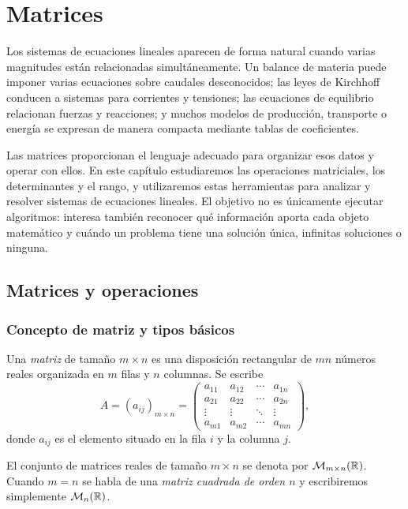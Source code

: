 \chapter{Matrices}
\label{ch:matrices}

Los sistemas de ecuaciones lineales aparecen de forma natural cuando varias magnitudes están relacionadas simultáneamente. Un balance de materia puede imponer varias ecuaciones sobre caudales desconocidos; las leyes de Kirchhoff conducen a sistemas para corrientes y tensiones; las ecuaciones de equilibrio relacionan fuerzas y reacciones; y muchos modelos de producción, transporte o energía se expresan de manera compacta mediante tablas de coeficientes.

Las matrices proporcionan el lenguaje adecuado para organizar esos datos y operar con ellos. En este capítulo estudiaremos las operaciones matriciales, los determinantes y el rango, y utilizaremos estas herramientas para analizar y resolver sistemas de ecuaciones lineales. El objetivo no es únicamente ejecutar algoritmos: interesa también reconocer qué información aporta cada objeto matemático y cuándo un problema tiene una solución única, infinitas soluciones o ninguna.

\section{Matrices y operaciones}
\label{sec:matrices-operaciones}

\subsection{Concepto de matriz y tipos básicos}

\begin{definition}[Matriz]
Una \emph{matriz} de tamaño $m\times n$ es una disposición rectangular de $mn$ números reales organizada en $m$ filas y $n$ columnas. Se escribe
\[
A=(a_{ij})_{m\times n}
=
\begin{pmatrix}
 a_{11}&a_{12}&\cdots&a_{1n}\\
 a_{21}&a_{22}&\cdots&a_{2n}\\
 \vdots&\vdots&\ddots&\vdots\\
 a_{m1}&a_{m2}&\cdots&a_{mn}
\end{pmatrix},
\]
donde $a_{ij}$ es el elemento situado en la fila $i$ y la columna $j$.
\end{definition}

El conjunto de matrices reales de tamaño $m\times n$ se denota por $\mathcal M_{m\times n}(\mathbb{R})$. Cuando $m=n$ se habla de una \emph{matriz cuadrada de orden $n$} y escribiremos simplemente $\mathcal M_n(\mathbb{R})$.

